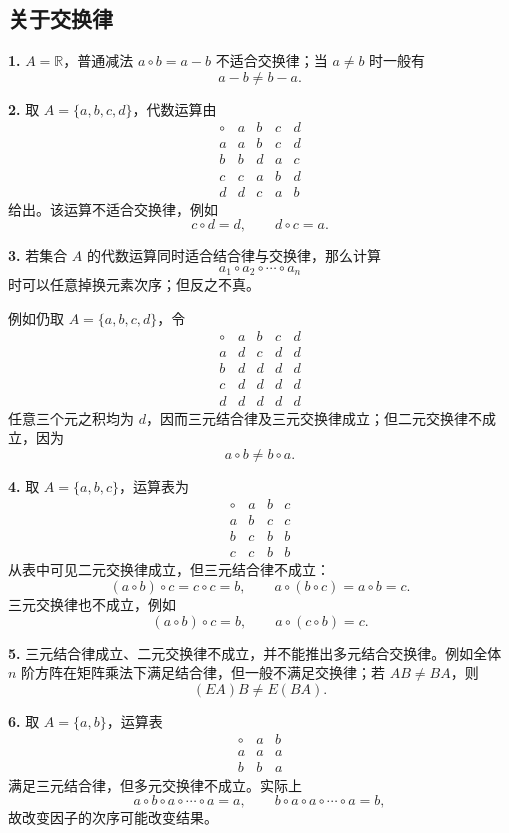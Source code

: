 \subsection*{关于交换律}

\textbf{1.} $A=\mathbb R$，普通减法 $a\circ b=a-b$ 不适合交换律；当 $a\ne b$ 时一般有
\[
a-b\ne b-a.
\]

\textbf{2.} 取 $A=\{a,b,c,d\}$，代数运算由
\[
\begin{array}{c|cccc}
\circ&a&b&c&d\\\hline
 a&a&b&c&d\\
 b&b&d&a&c\\
 c&c&a&b&d\\
 d&d&c&a&b
\end{array}
\]
给出。该运算不适合交换律，例如
\[
c\circ d=d,
\qquad
 d\circ c=a.
\]

\textbf{3.} 若集合 $A$ 的代数运算同时适合结合律与交换律，那么计算
\[
a_1\circ a_2\circ\cdots\circ a_n
\]
时可以任意掉换元素次序；但反之不真。

例如仍取 $A=\{a,b,c,d\}$，令
\[
\begin{array}{c|cccc}
\circ&a&b&c&d\\\hline
 a&d&c&d&d\\
 b&d&d&d&d\\
 c&d&d&d&d\\
 d&d&d&d&d
\end{array}
\]
任意三个元之积均为 $d$，因而三元结合律及三元交换律成立；但二元交换律不成立，因为
\[
a\circ b\ne b\circ a.
\]

\textbf{4.} 取 $A=\{a,b,c\}$，运算表为
\[
\begin{array}{c|ccc}
\circ&a&b&c\\\hline
 a&b&c&c\\
 b&c&b&b\\
 c&c&b&b
\end{array}
\]
从表中可见二元交换律成立，但三元结合律不成立：
\[
(a\circ b)\circ c=c\circ c=b,
\qquad
 a\circ(b\circ c)=a\circ b=c.
\]
三元交换律也不成立，例如
\[
(a\circ b)\circ c=b,
\qquad
 a\circ(c\circ b)=c.
\]

\textbf{5.} 三元结合律成立、二元交换律不成立，并不能推出多元结合交换律。例如全体 $n$ 阶方阵在矩阵乘法下满足结合律，但一般不满足交换律；若 $AB\ne BA$，则
\[
(EA)B\ne E(BA).
\]

\textbf{6.} 取 $A=\{a,b\}$，运算表
\[
\begin{array}{c|cc}
\circ&a&b\\\hline
 a&a&a\\
 b&b&a
\end{array}
\]
满足三元结合律，但多元交换律不成立。实际上
\[
a\circ b\circ a\circ\cdots\circ a=a,
\qquad
 b\circ a\circ a\circ\cdots\circ a=b,
\]
故改变因子的次序可能改变结果。

